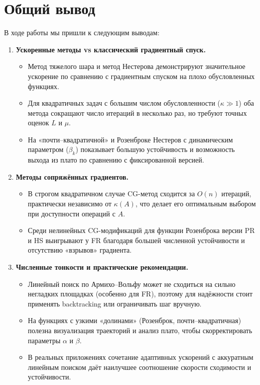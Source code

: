 \documentclass[a4paper]{article}
\begin{document}
\section{Общий вывод}
В ходе работы мы пришли к следующим выводам:
\begin{enumerate}
  \item \textbf{Ускоренные методы vs классический градиентный спуск.}
    \begin{itemize}
      \item Метод тяжелого шара и метод Нестерова демонстрируют значительное ускорение по сравнению с градиентным спуском на плохо обусловленных функциях.
      \item Для квадратичных задач с большим числом обусловленности (\(\kappa\gg1\)) оба метода сокращают число итераций в несколько раз, но требуют точных оценок \(L\) и \(\mu\).
      \item На «почти–квадратичной» и Розенброке Нестеров с динамическим параметром (\(\beta_k\)) показывает большую устойчивость и возможность выхода из плато по сравнению с фиксированной версией.
    \end{itemize}

  \item \textbf{Методы сопряжённых градиентов.}
    \begin{itemize}
      \item В строгом квадратичном случае CG-метод сходится за \(O(n)\) итераций, практически независимо от \(\kappa(A)\), что делает его оптимальным выбором при доступности операций с \(A\).
      \item Среди нелинейных CG-модификаций для функции Розенброка версии PR и HS выигрывают у FR благодаря большей численной устойчивости и отсутствию «взрывов» градиента.
    \end{itemize}

  \item \textbf{Численные тонкости и практические рекомендации.}
    \begin{itemize}
      \item Линейный поиск по Армихо–Вольфу может не сходиться на сильно негладких площадках (особенно для FR), поэтому для надёжности стоит применять backtracking или ограничивать шаг вручную.
      \item На функциях с узкими «долинами» (Розенброк, почти–квадратичная) полезна визуализация траекторий и анализ плато, чтобы скорректировать параметры \(\alpha\) и \(\beta\).
      \item В реальных приложениях сочетание адаптивных ускорений с аккуратным линейным поиском даёт наилучшее соотношение скорости сходимости и устойчивости.
    \end{itemize}
\end{enumerate}
\end{document}
